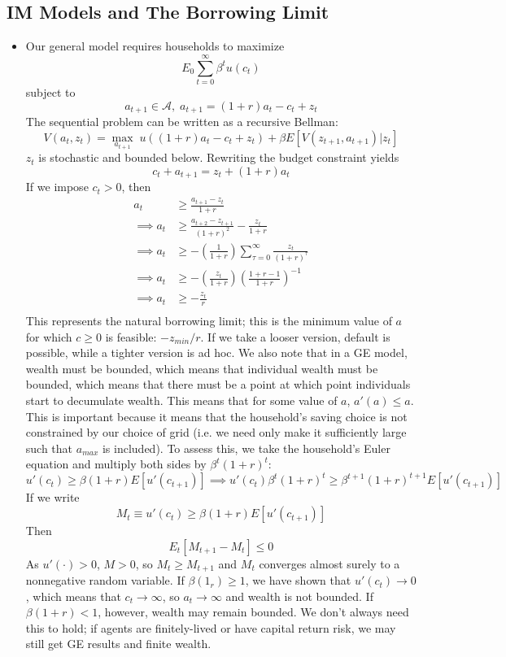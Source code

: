 \documentclass[12pt]{article}
\begin{document}
\subsection{IM Models and The Borrowing Limit}

\begin{itemize}
    \item Our general model requires households to maximize
    \[E_0\sum_{t=0}^{\infty}\beta^tu(c_t)\]
    subject to
    \[a_{t+1} \in \mathcal{A},\; a_{t+1} = (1+r)a_t - c_t + z_t\]
    The sequential problem can be written as a recursive Bellman:
    \[V(a_t,z_t) = \max_{a_{t+1}}\; u((1+r)a_t - c_t + z_t) + \beta E[V(z_{t+1}, a_{t+1})|z_t]\]
    $z_t$ is stochastic and bounded below. Rewriting the budget constraint yields
    \[c_t + a_{t+1} = z_t + (1+r)a_t\]
    If we impose $c_t > 0$, then
    \[\begin{split}
        a_t &\geq \frac{a_{t+1}-z_t}{1+r} \\
        \implies a_t &\geq \frac{a_{t+2} - z_{t+1}}{(1+r)^2} - \frac{z_t}{1+r} \\
        \implies a_t &\geq -\left(\frac{1}{1+r}\right)\sum_{\tau = 0}^{\infty}\frac{z_t}{(1+r)^{\tau}} \\
        \implies a_t &\geq -\left(\frac{z_t}{1+r}\right)\left(\frac{1+r-1}{1+r}\right)^{-1} \\
        \implies a_t &\geq -\frac{z_t}{r} \\
    \end{split}\]
    This represents the natural borrowing limit; this is the minimum value of $a$ for which $c \geq 0$ is feasible: $-z_{min}/r$. If we take a looser version, default is possible, while a tighter version is ad hoc. We also note that in a GE model, wealth must be bounded, which means that individual wealth must be bounded, which means that there must be a point at which point individuals start to decumulate wealth. This means that for some value of $a$, $a'(a) \leq a$. This is important because it means that the household's saving choice is not constrained by our choice of grid (i.e. we need only make it sufficiently large such that $a_{max}$ is included). To assess this, we take the household's Euler equation and multiply both sides by $\beta^t(1+r)^t$:
    \[u'(c_t) \geq \beta(1+r)E[u'(c_{t+1})] \implies u'(c_t)\beta^t(1+r)^t \geq \beta^{t+1}(1+r)^{t+1}E[u'(c_{t+1})]\]
    If we write
    \[M_t \equiv u'(c_t) \geq \beta(1+r)E[u'(c_{t+1})]\]
    Then
    \[E_t[M_{t+1} - M_t] \leq 0\]
    As $u'(\cdot) >0$, $M >0$, so $M_t \geq M_{t+1}$ and $M_t$ converges almost surely to a nonnegative random variable. If $\beta(1_r) \geq 1$, we have shown that $u'(c_t) \to 0$, which means that $c_t \to \infty$, so $a_t \to\infty$ and wealth is not bounded. If $\beta(1+r) < 1$, however, wealth may remain bounded. We don't always need this to hold; if agents are finitely-lived or have capital return risk, we may still get GE results and finite wealth.

\end{itemize}
\end{document}
